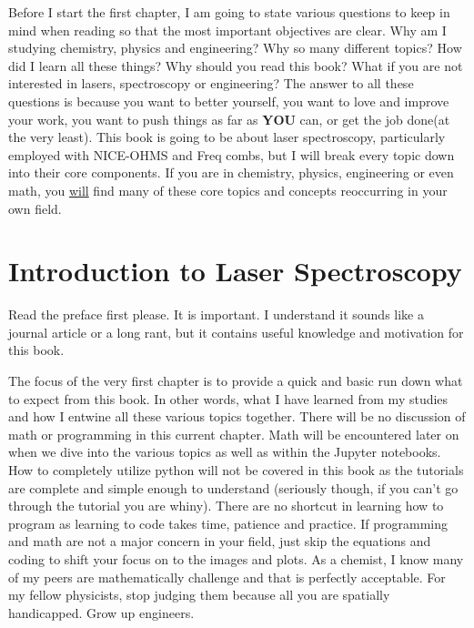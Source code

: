 \documentclass[11pt,a4paper]{book}
\begin{document}
	Before I start the first chapter, I am going to state various questions to keep in mind when reading so that the most important objectives are clear. Why am I studying chemistry, physics and engineering? Why so many different topics? How did I learn all these things? Why should you read this book? What if you are not interested in lasers, spectroscopy or engineering? The answer to all these questions is because you want to better yourself, you want to love and improve your work, you want to push things as far as {\bfseries YOU} can, or get the job done(at the very least). This book is going to be about laser spectroscopy, particularly employed with NICE-OHMS and Freq combs, but I will break every topic down into their core components. If you are in chemistry, physics, engineering or even math, you {\underline{will}} find many of these core topics and concepts reoccurring in your own field.

\mainmatter
\chapter{Introduction to Laser Spectroscopy}
	\label{chp:Introduction to Laser Spectroscopy}
	Read the preface first please. It is important. I understand it sounds like a journal article or a long rant, but it contains useful knowledge and motivation for this book.
	
	The focus of the very first chapter is to provide a quick and basic run down what to expect from this book. In other words, what I have learned from my studies and how I entwine all these various topics together. There will be no discussion of math or programming in this current chapter. Math will be encountered later on when we dive into the various topics as well as within the Jupyter notebooks. How to completely utilize python will not be covered in this book as the tutorials are complete and simple enough to understand (seriously though, if you can't go through the tutorial you are whiny). There are no shortcut in learning how to program as learning to code takes time, patience and practice. If programming and math are not a major concern in your field, just skip the equations and coding to shift your focus on to the images and plots. As a chemist, I know many of my peers are mathematically challenge and that is perfectly acceptable. For my fellow physicists, stop judging them because all you are spatially handicapped. Grow up engineers.
	
\end{document}
